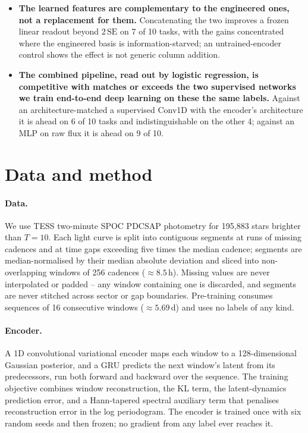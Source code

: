 \documentclass{article}
\providecommand{\DIFaddtex}[1]{{\protect\color{blue} \sf #1}} %
\providecommand{\DIFdeltex}[1]{{\protect\color{red} \scriptsize #1}} %
\providecommand{\DIFaddbegin}{} %
\providecommand{\DIFaddend}{} %
\providecommand{\DIFdelbegin}{} %
\providecommand{\DIFdelend}{} %
\providecommand{\DIFadd}[1]{\texorpdfstring{\DIFaddtex{#1}}{#1}} %
\providecommand{\DIFdel}[1]{\texorpdfstring{\DIFdeltex{#1}}{}} %
\providecommand{\DIFscaledelfig}{0.5}
\newlength{\DIFdelgraphicswidth} %
\newlength{\DIFdelgraphicsheight} %
\providecommand{\DIFaddincludegraphics}[2][]{{\color{blue}\fbox{\DIFOincludegraphics[#1]{#2}}}} %
\providecommand{\DIFdelincludegraphics}[2][]{%
\sbox{\DIFdelgraphicsbox}{\DIFOincludegraphics[#1]{#2}}%
\settoboxwidth{\DIFdelgraphicswidth}{\DIFdelgraphicsbox} %
\settoboxtotalheight{\DIFdelgraphicsheight}{\DIFdelgraphicsbox} %
\scalebox{\DIFscaledelfig}{%
\parbox[b]{\DIFdelgraphicswidth}{\usebox{\DIFdelgraphicsbox}\\[-\baselineskip] \rule{\DIFdelgraphicswidth}{0em}}\llap{\resizebox{\DIFdelgraphicswidth}{\DIFdelgraphicsheight}{%
\setlength{\unitlength}{\DIFdelgraphicswidth}%
\begin{picture}(1,1)%
\thicklines\linethickness{2pt} %
{\color[rgb]{1,0,0}\put(0,0){\framebox(1,1){}}}%
{\color[rgb]{1,0,0}\put(0,0){\line( 1,1){1}}}%
{\color[rgb]{1,0,0}\put(0,1){\line(1,-1){1}}}%
\end{picture}%
}\hspace*{3pt}}} %
} %
\DeclareRobustCommand{\DIFaddbegin}{\DIFOaddbegin \let\includegraphics\DIFaddincludegraphics} %
\DeclareRobustCommand{\DIFaddend}{\DIFOaddend \let\includegraphics\DIFOincludegraphics} %
\DeclareRobustCommand{\DIFdelbegin}{\DIFOdelbegin \let\includegraphics\DIFdelincludegraphics} %
\DeclareRobustCommand{\DIFdelend}{\DIFOaddend \let\includegraphics\DIFOincludegraphics} %
\begin{document}
\begin{itemize}
\item \textbf{The learned features are complementary to the engineered ones, not a replacement for
them.} Concatenating the two improves a frozen linear readout beyond $2\,\mathrm{SE}$ on 7 of 10
tasks, with the gains concentrated where the engineered basis is information-starved; an
untrained-encoder control shows the effect is not generic column addition.
\item \textbf{The combined pipeline, read out by logistic regression, \DIFdelbegin \DIFdel{is competitive with }\DIFdelend \DIFaddbegin \DIFadd{matches or exceeds the two
supervised networks we train }\DIFaddend end-to-end \DIFdelbegin \DIFdel{deep learning }\DIFdelend on \DIFdelbegin \DIFdel{these }\DIFdelend \DIFaddbegin \DIFadd{the same }\DIFaddend labels.} Against \DIFdelbegin \DIFdel{an architecture-matched }\DIFdelend \DIFaddbegin \DIFadd{a }\DIFaddend supervised Conv1D \DIFaddbegin \DIFadd{with the
encoder's architecture }\DIFaddend it is ahead on 6
of 10 tasks and indistinguishable on the other 4; against an MLP on raw flux it is ahead on 9 of 10.
\end{itemize}

\section{Data and method}

\paragraph{Data.} We use TESS two-minute SPOC PDCSAP photometry for 195{,}883 stars brighter than
$T = 10$. Each light curve is split into contiguous segments at runs of missing cadences and at time
gaps exceeding five times the median cadence; segments are median-normalised by their median absolute
deviation and sliced into non-overlapping windows of 256 cadences ($\approx 8.5$\,h). Missing values
are never interpolated or padded -- any window containing one is discarded, and segments are never
stitched across sector or gap boundaries. Pre-training consumes sequences of 16 consecutive windows
($\approx 5.69$\,d) and uses no labels of any kind.

\paragraph{Encoder.} A 1D convolutional variational encoder \citep{kingma2014} maps each window to a
128-dimensional Gaussian posterior, and a GRU \citep{cho2014} predicts the next window's latent from
its predecessors, run both forward and backward over the sequence. The training objective combines
window reconstruction, the KL term, the latent-dynamics prediction error, and a Hann-tapered spectral
auxiliary term that penalises reconstruction error in the log periodogram. The encoder is trained
once with six random seeds and then frozen; no gradient from any label ever reaches it.
\end{document}
